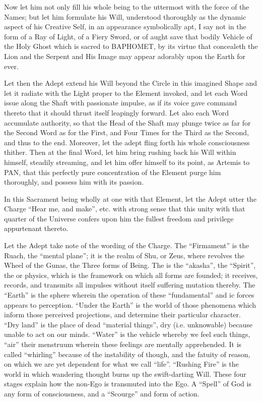 Now let him not only fill his whole being to the uttermost with the force of the Names; but let him formulate his Will, understood thoroughly as the dynamic aspect of his Creative Self, in an appearance symbolically apt, I say not in the form of a Ray of Light, of a Fiery Sword, or of aught save that bodily Vehicle of the Holy Ghost which is sacred to BAPHOMET, by its virtue that concealeth the Lion and the Serpent and His Image may appear adorably upon the Earth for ever.

Let then the Adept extend his Will beyond the Circle in this imagined Shape and let it radiate with the Light proper to the Element invoked, and let each Word issue along the Shaft with passionate impulse, as if its voice gave command thereto that it should thrust itself leapingly forward. Let also each Word accumulate authority, so that the Head of the Shaft may plunge twice as far for the Second Word as for the First, and Four Times for the Third as the Second, and thus to the end. Moreover, let the adept fling forth his whole consciousness thither. Then at the final Word, let him bring rushing back his Will within himself, steadily streaming, and let him offer himself to its point, as Artemis to PAN, that this perfectly pure concentration of the Element purge him thoroughly, and possess him with its passion.

In this Sacrament being wholly at one with that Element, let the Adept utter the Charge \enquote{Hear me, and make}, etc. with strong sense that this unity with that quarter of the Universe confers upon him the fullest freedom and privilege appurtenant thereto.

Let the Adept take note of the wording of the Charge. The \enquote{Firmament} is the Ruach, the \enquote{mental plane}; it is the realm of Shu, or Zeus, where revolves the Wheel of the Gunas, the Three forms of Being\footnotemark. The \AEthyr{}\index{\AEthyr{}} is the \enquote{akasha}, the \enquote{Spirit}, the \AEthyr{} or physics, which is the framework on which all forms are founded; it receives, records, and transmits all impulses without itself suffering mutation thereby. The \enquote{Earth} is the sphere wherein the operation of these \enquote{fundamental} and \aethyr{}ic forces appears to perception. \enquote{Under the Earth} is the world of those phenomena which inform those perceived projections, and determine their particular character. \enquote{Dry land} is the place of dead \enquote{material things}, dry (i.e. unknowable) because unable to act on our minds. \enquote{Water} is the vehicle whereby we feel such things, \enquote{air} their menstruum wherein these feelings are mentally apprehended. It is called \enquote{whirling} because of the instability of though, and the fatuity of reason, on which we are yet dependent for what we call \enquote{life}. \enquote{Rushing Fire} is the world in which wandering thought burns up the swift-darting Will. These four stages explain how the non-Ego is transmuted into the Ego. A \enquote{Spell} of God is any form of consciousness, and a \enquote{Scourge} and form of action.

